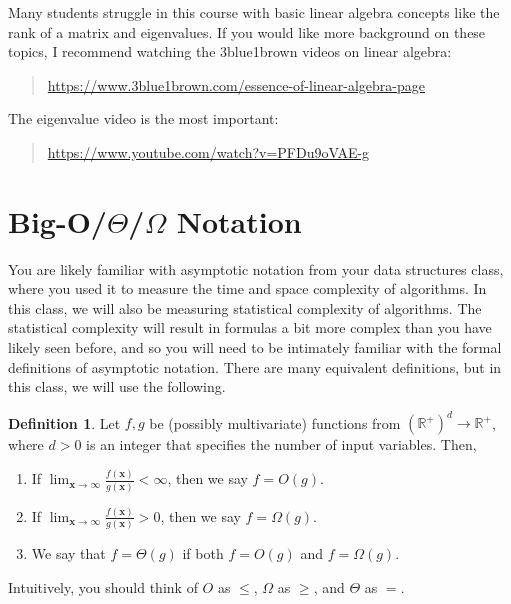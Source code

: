 \documentclass[10pt]{article}
\theoremstyle{definition}
\newtheorem{defn}{Definition}
\newcommand{\R}{\mathbb R}
\newcommand{\x}{\mathbf x}
\begin{document}
Many students struggle in this course with basic linear algebra concepts like the rank of a matrix and eigenvalues.
If you would like more background on these topics, I recommend watching the 3blue1brown videos on linear algebra:
\begin{quote}
    \url{https://www.3blue1brown.com/essence-of-linear-algebra-page}
\end{quote}
The eigenvalue video is the most important:
\begin{quote}
    \url{https://www.youtube.com/watch?v=PFDu9oVAE-g}
\end{quote}

\section{Big-O/$\Theta$/$\Omega$ Notation}

You are likely familiar with asymptotic notation from your data structures class,
where you used it to measure the time and space complexity of algorithms.
In this class,
we will also be measuring statistical complexity of algorithms.
The statistical complexity will result in formulas a bit more complex than you have likely seen before,
and so you will need to be intimately familiar with the formal definitions of asymptotic notation.
There are many equivalent definitions, but in this class, we will use the following.

\begin{defn}
    Let $f,g$ be (possibly multivariate) functions from $(\R^+)^d\to\R^+$,
    where $d>0$ is an integer that specifies the number of input variables.
    Then,
    \begin{enumerate}
        \item If $\displaystyle\lim_{\x\to\infty} \frac{f(\x)}{g(\x)} < \infty$, then we say $f = O(g)$.
        \item If $\displaystyle\lim_{\x\to\infty} \frac{f(\x)}{g(\x)} > 0$, then we say $f = \Omega(g)$.
        \item We say that $f = \Theta(g)$ if both $f=O(g)$ and $f=\Omega(g)$.
    \end{enumerate}
    Intuitively, you should think of $O$ as $\le$, $\Omega$ as $\ge$, and $\Theta$ as $=$.
\end{defn}
\end{document}
